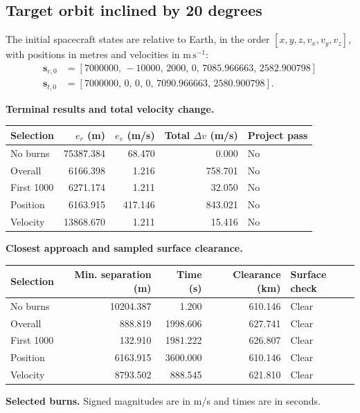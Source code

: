 \subsection{Target orbit inclined by 20 degrees}
The initial spacecraft states are relative to Earth, in the order
$[x,y,z,v_x,v_y,v_z]$, with positions in metres and velocities in
$\mathrm{m\,s^{-1}}$:
\begin{align*}
\mathbf s_{c,0}&=[7000000,\,-10000,\,2000,\,0,\,7085.966663,\,2582.900798]\\
\mathbf s_{t,0}&=[7000000,\,0,\,0,\,0,\,7090.966663,\,2580.900798].
\end{align*}
\par\noindent\textbf{Terminal results and total velocity change.}
\begin{center}
\begin{tabular}{lrrrl}
\toprule
Selection & $e_r$ (m) & $e_v$ (m/s) & Total $\Delta v$ (m/s) & Project pass\\
\midrule
No burns & 75387.384 & 68.470 & 0.000 & No\\
Overall & 6166.398 & 1.216 & 758.701 & No\\
First 1000 & 6271.174 & 1.211 & 32.050 & No\\
Position & 6163.915 & 417.146 & 843.021 & No\\
Velocity & 13868.670 & 1.211 & 15.416 & No\\
\bottomrule
\end{tabular}
\end{center}
\par\noindent\textbf{Closest approach and sampled surface clearance.}
\begin{center}
\begin{tabular}{lrrrl}
\toprule
Selection & Min. separation (m) & Time (s) & Clearance (km) & Surface check\\
\midrule
No burns & 10204.387 & 1.200 & 610.146 & Clear\\
Overall & 888.819 & 1998.606 & 627.741 & Clear\\
First 1000 & 132.910 & 1981.222 & 626.807 & Clear\\
Position & 6163.915 & 3600.000 & 610.146 & Clear\\
Velocity & 8793.502 & 888.545 & 621.810 & Clear\\
\bottomrule
\end{tabular}
\end{center}
\par\noindent\textbf{Selected burns.} Signed magnitudes are in m/s and times are in seconds.
